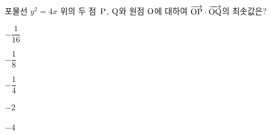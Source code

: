 포물선 $y^2=4x$ 위의 두 점~$\mathrm{P}$, $\mathrm{Q}$와 원점 $\mathrm{O}$에 대하여 $\overrightarrow{\mathrm{OP}}\cdot\overrightarrow{\mathrm{OQ}}$의 최솟값은?
\begin{choices32}{\rule[-3ex]{0pt}{8ex}$-\dfrac{1}{16}$}{\rule[-3ex]{0pt}{8ex}$-\dfrac{1}{8}$}{\rule[-3ex]{0pt}{8ex}$-\dfrac{1}{4}$}{\rule[-3ex]{0pt}{8ex}$-2$}{\rule[-3ex]{0pt}{8ex}$-4$}\end{choices32}
